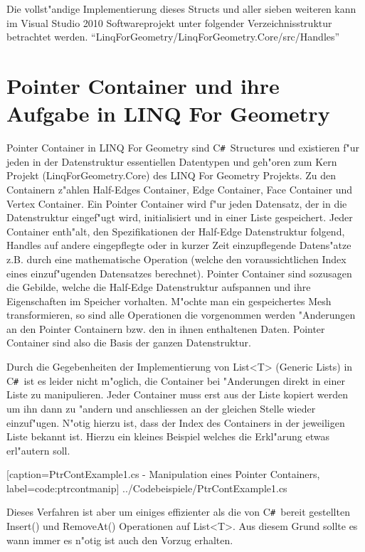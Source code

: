 \documentclass[pagesize, paper=a4, fontsize=12pt,titlepage=true, headings=small, headnosepline, abstractoff, liststotoc, nochapterprefix, plainheadsepline]{scrreprt}
\newcommand{\CSS}{C\texttt{\# }}
\newcommand{\LFG}{LINQ For Geometry}
\newcommand{\LFGS}{LINQ For Geometry }
\newcommand{\HES}{Half-Edge Datenstruktur }
\begin{document}
Die vollst"andige Implementierung dieses Structs und aller sieben weiteren kann im Visual Studio 2010 Softwareprojekt unter folgender Verzeichnisstruktur betrachtet werden. "`LinqForGeometry/LinqForGeometry.Core/src/Handles"'

\section {Pointer Container und ihre Aufgabe in \LFG}
		Pointer Container in \LFGS sind \CSS Structures und existieren f"ur jeden in der Datenstruktur essentiellen Datentypen und geh"oren zum Kern Projekt (LinqForGeometry.Core) des \LFGS Projekts. Zu den Containern z"ahlen Half-Edges Container, Edge Container, Face Container und Vertex Container. Ein Pointer Container wird f"ur jeden Datensatz, der in die Datenstruktur eingef"ugt wird, initialisiert und in einer Liste gespeichert. Jeder Container enth"alt, den Spezifikationen der \HES folgend, Handles auf andere eingepflegte oder in kurzer Zeit einzupflegende Datens"atze z.B. durch eine mathematische Operation (welche den voraussichtlichen Index eines einzuf"ugenden Datensatzes berechnet). Pointer Container sind sozusagen die Gebilde, welche die Half-Edge Datenstruktur aufspannen und ihre Eigenschaften im Speicher vorhalten. M"ochte man ein gespeichertes Mesh transformieren, so sind alle Operationen die vorgenommen werden "Anderungen an den Pointer Containern bzw. den in ihnen enthaltenen Daten. Pointer Container sind also die Basis der ganzen Datenstruktur.
\newline

Durch die Gegebenheiten der Implementierung von List<T> (Generic Lists) in \CSS ist es leider nicht m"oglich, die Container bei "Anderungen direkt in einer Liste zu manipulieren. Jeder Container muss erst aus der Liste kopiert werden um ihn dann zu "andern und anschliessen an der gleichen Stelle wieder einzuf"ugen. N"otig hierzu ist, dass der Index des Containers in der jeweiligen Liste bekannt ist. Hierzu ein kleines Beispiel welches die Erkl"arung etwas erl"autern soll.

			[caption={PtrContExample1.cs - Manipulation eines Pointer Containers}, label=code:ptrcontmanip]
			{../Codebeispiele/PtrContExample1.cs}

Dieses Verfahren ist aber um einiges effizienter als die von \CSS bereit gestellten Insert() und RemoveAt() Operationen auf List<T>. Aus diesem Grund sollte es wann immer es n"otig ist auch den Vorzug erhalten.
\end{document}
